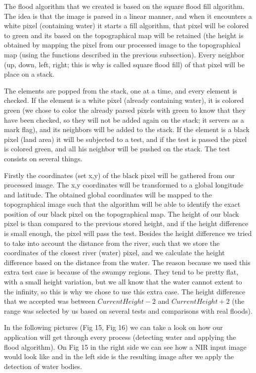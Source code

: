 \documentclass[12pt, a4paper]{report}
\begin{document}
The flood algorithm that we created is based on the square flood fill algorithm. The idea is that the image is parsed in a linear manner, and when it encounters a white pixel (containing water) it starts a fill algorithm, that pixel will be colored to green and its based on the topographical map will be retained (the height is obtained by mapping the pixel from our processed image to the topographical map (using the functions described in the previous subsection). Every neighbor (up, down, left, right; this is why is called square flood fill) of that pixel will be place on a stack. \par 
The elements are popped from the stack, one at a time, and every element is checked. If the element is a white pixel (already containing water), it is colored green (we chose to color the already parsed pixels with green to know that they have been checked, so they will not be added again on the stack; it servers as a mark flag), and its neighbors will be added to the stack. If the element is a black pixel (land area) it will be subjected to a test, and if the test is passed the pixel is colored green, and all his neighbor will be pushed on the stack. The test consists on several things.
\par 
 Firstly the coordinates (set x,y) of the black pixel will be gathered from our processed image. The x,y coordinates will be transformed to a global longitude and latitude. The obtained global coordinates will be mapped to the topographical image such that the algorithm will be able to identify the exact position of our black pixel on the topographical map. The height of our black pixel is than compared to the previous stored height, and if the height difference is small enough, the pixel will pass the test. Besides the height difference we tried to take into account the distance from the river, such that we store the coordinates of the closest river (water) pixel, and we calculate the height difference based on the distance from the water. The reason because we used this extra test case is because of the swampy regions. They tend to be pretty flat, with a small height variation, but we all know that the water cannot extent to the infinity, so this is why we chose to use this extra case. The height difference that we accepted was between \textbf{$CurrentHeight - 2$} and \textbf{$CurrentHeight + 2$} (the range was selected by us based on several tests and comparisons with real floods).
\par 
In the following pictures (Fig 15, Fig 16) we can take a look on how our application will get through every process (detecting water and applying the flood algorithm). On Fig 15 in the right side we can see how a NIR input image would look like and in the left side is the resulting image after we apply the detection of water bodies.
\end{document}
